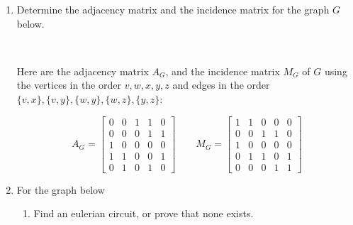 \documentclass[11pt]{amsart}
\begin{document}
\begin{enumerate}

\item Determine the adjacency matrix and the incidence matrix for the graph $G$ below.\\[3pt]


 \\[5pt]

{\color{blue}

 Here are the  adjacency matrix $A_G$, and the  incidence matrix $M_G$ of $G$
 using the vertices in the order $v,w,x,y,z$  and edges in the order $\{v,x\}, \{v,y\}, \{w,y\}, \{w,z\},\{y,z\}$:
 
 \[
  A_G=\left[
   \begin{matrix}
    0&0&1&1&0 \\ 
    0&0&0&1&1 \\ 
    1&0&0&0&0 \\ 
    1&1&0&0&1 \\ 
    0&1&0&1&0
   \end{matrix}
  \right]
  \qquad
  M_G=\left[
  \begin{matrix}
    1&1&0&0&0\\
    0&0&1&1&0 \\ 
    1&0&0&0&0 \\ 
    0&1&1&0&1 \\
    0&0&0&1&1
   \end{matrix}
  \right]
 \]
}           
\vfill\break

\item  For the graph below
 \begin{enumerate}
  \item  Find an eulerian circuit, or prove that none exists.\\[3pt]
  

\end{enumerate}
\end{enumerate}
\end{document}
